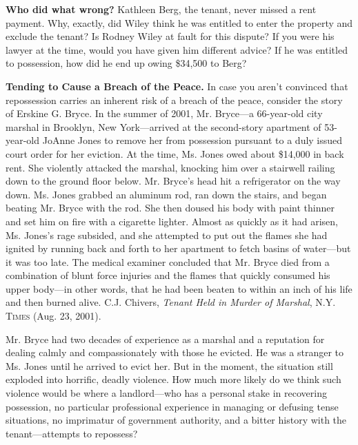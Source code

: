
\item \textbf{Who did what wrong?} Kathleen Berg, the tenant, never missed a
rent payment.  Why, exactly, did Wiley think he was entitled to enter the
property and exclude the tenant?  Is Rodney Wiley at fault for this dispute? 
If you were his lawyer at the time, would you have given him different advice? 
If he was entitled to possession, how did he end up owing \$34,500 to Berg?


\item \textbf{Tending to Cause a Breach of the Peace.} In case you aren't
convinced that repossession carries an inherent risk of a breach of the peace,
consider the story of Erskine G. Bryce. In the summer of 2001, Mr. Bryce---a
66-year-old city marshal in Brooklyn, New York---arrived at the second-story
apartment of 53-year-old JoAnne Jones to remove her from possession pursuant to
a duly issued court order for her eviction. At the time, Ms. Jones owed about
\$14,000 in back rent. She violently attacked the marshal, knocking him over a
stairwell railing down to the ground floor below. Mr. Bryce's head hit a
refrigerator on the way down. Ms. Jones grabbed an aluminum rod, ran down the
stairs, and began beating Mr. Bryce with the rod. She then doused his body with
paint thinner and set him on fire with a cigarette lighter. Almost as quickly
as it had arisen, Ms. Jones's rage subsided, and she attempted to put out the
flames she had ignited by running back and forth to her apartment to fetch
basins of water---but it was too late. The medical examiner concluded that Mr.
Bryce died from a combination of blunt force injuries and the flames that
quickly consumed his upper body---in other words, that he had been beaten to
within an inch of his life and then burned alive. C.J. Chivers, \textit{Tenant
Held in Murder of Marshal}, \textsc{N.Y. Times} (Aug. 23, 2001).

Mr. Bryce had two decades of experience as a marshal and a reputation for
dealing calmly and compassionately with those he evicted. He was a stranger to
Ms. Jones until he arrived to evict her. But in the moment, the situation still
exploded into horrific, deadly violence. How much more likely do we think such
violence would be where a landlord---who has a personal stake in recovering
possession, no particular professional experience in managing or defusing tense
situations, no imprimatur of government authority, and a bitter history with
the tenant---attempts to repossess?  


